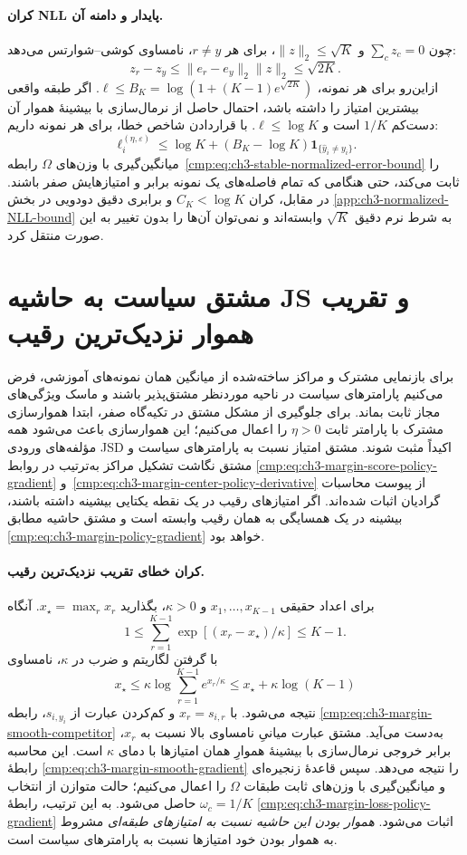 \paragraph{کران NLL پایدار و دامنه آن.}
چون $\sum_cz_c=0$ و
$\|z\|_2\le\sqrt K$،
برای هر $r\ne y$،
نامساوی کوشی--شوارتس می‌دهد:
\[
z_r-z_y\le
\|e_r-e_y\|_2\|z\|_2
\le\sqrt{2K}.
\]
ازاین‌رو برای هر نمونه،
$\ell\le B_K
=\log(1+(K-1)e^{\sqrt{2K}})$.
اگر طبقه واقعی بیشترین
امتیاز را داشته باشد،
احتمال حاصل از نرمال‌سازی با بیشینهٔ هموار آن دست‌کم
$1/K$ است و
$\ell\le\log K$.
با قراردادن شاخص خطا، برای
هر نمونه داریم:
\[
\ell_i^{(\eta,\varepsilon)}
\le\log K+(B_K-\log K)
\mathbf1_{\{\widehat y_i\ne y_i\}}.
\]
میانگین‌گیری با وزن‌های $\Omega$
رابطه~\eqref{cmp:eq:ch3-stable-normalized-error-bound}
را ثابت می‌کند، حتی هنگامی که
تمام فاصله‌های یک نمونه برابر
و امتیازهایش صفر باشند.
در مقابل، کران
$C_K<\log K$ و برابری دقیق
دودویی در بخش
\ref{app:ch3-normalized-NLL-bound}
به شرط نرم دقیق $\sqrt K$
وابسته‌اند و نمی‌توان آن‌ها را
بدون تغییر به این صورت منتقل کرد.


\section{مشتق سیاست به حاشیه JS و تقریب هموار نزدیک‌ترین رقیب}
\label{app:ch3-margin-gradient}
برای بازنمایی مشترک و
مراکز ساخته‌شده از میانگین
همان نمونه‌های آموزشی،
فرض می‌کنیم پارامترهای
سیاست در ناحیه موردنظر
مشتق‌پذیر باشند و
ماسک ویژگی‌های مجاز
ثابت بماند. برای
جلوگیری از مشکل مشتق
در تکیه‌گاه صفر، ابتدا
هموارسازی مشترک با
پارامتر ثابت $\eta>0$
را اعمال می‌کنیم؛
این هموارسازی باعث
می‌شود همه مؤلفه‌های
ورودی JSD اکیداً مثبت
شوند. مشتق امتیاز نسبت به پارامترهای سیاست و
مشتق نگاشت تشکیل مراکز به‌ترتیب در روابط
\eqref{cmp:eq:ch3-margin-score-policy-gradient}
و~\eqref{cmp:eq:ch3-margin-center-policy-derivative}
از پیوست محاسبات گرادیان اثبات شده‌اند.
اگر امتیازهای رقیب
در یک نقطه یکتایی
بیشینه داشته باشند،
بیشینه در یک همسایگی
به همان رقیب وابسته
است و مشتق حاشیه
مطابق
\eqref{cmp:eq:ch3-margin-policy-gradient}
خواهد بود.

\paragraph{کران خطای تقریب نزدیک‌ترین رقیب.}
برای اعداد حقیقی
$x_1,\ldots,x_{K-1}$
و $\kappa>0$،
بگذارید
$x_\star=\max_r x_r$.
آنگاه
\[
1\le\sum_{r=1}^{K-1}
\exp[(x_r-x_\star)/\kappa]\le K-1.
\]
با گرفتن لگاریتم
و ضرب در $\kappa$،
نامساوی
\[
x_\star\le
\kappa\log\sum_{r=1}^{K-1}
e^{x_r/\kappa}
\le x_\star+\kappa\log(K-1)
\]
نتیجه می‌شود. با
$x_r=s_{i,r}$ و
کم‌کردن عبارت از
$s_{i,y_i}$،
رابطه
\eqref{cmp:eq:ch3-margin-smooth-competitor}
به‌دست می‌آید.
مشتق عبارت میانیِ نامساوی بالا
نسبت به $x_r$،
برابر خروجی نرمال‌سازی با بیشینهٔ هموارِ همان امتیازها
با دمای $\kappa$ است.
این محاسبه رابطهٔ
\eqref{cmp:eq:ch3-margin-smooth-gradient}
را نتیجه می‌دهد.
سپس قاعدهٔ زنجیره‌ای
و میانگین‌گیری با وزن‌های ثابت طبقات $\Omega$ را اعمال می‌کنیم؛ حالت متوازن از انتخاب $\omega_c=1/K$ حاصل می‌شود.
به این ترتیب، رابطهٔ
\eqref{cmp:eq:ch3-margin-loss-policy-gradient}
اثبات می‌شود.
\emph{هموار بودن این حاشیه
نسبت به امتیازهای طبقه‌ای}
مشروط به هموار بودن
خود امتیازها نسبت
به پارامترهای سیاست است.



